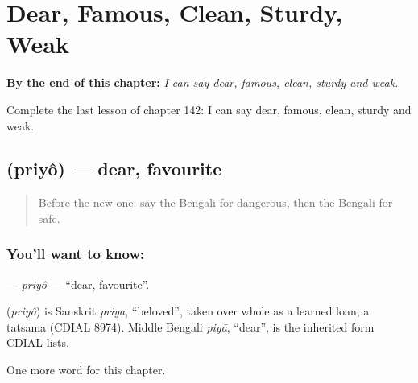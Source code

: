 
\chapter{Dear, Famous, Clean, Sturdy, Weak}
\label{ch:bn-dear-famous-clean-sturdy-weak}

\begin{chapteropening}
\textbf{By the end of this chapter:} \emph{I can say dear, famous, clean, sturdy and weak.}

Complete the last lesson of chapter 142: I can say dear, famous, clean, sturdy and weak.
\end{chapteropening}

\section[\texorpdfstring{\bn{প্রিয়} (priyô)}{প্রিয় (priyô)}]{ (priyô) — dear, favourite}

\label{lesson:BN-C142-priyo}



\begin{quote}
Before the new one: say the Bengali for dangerous, then the Bengali for safe.
\end{quote}

\subsection*{You'll want to know: }
\textbf{} — \emph{priyô} — \textquotedblleft{}dear, favourite\textquotedblright{}.

\begin{cousinweb}
\textbf{} (\emph{priyô}) is Sanskrit \emph{priya}, \textquotedblleft{}beloved\textquotedblright{}, taken over whole as a learned loan, a tatsama (CDIAL 8974). Middle Bengali \emph{piyā}, \textquotedblleft{}dear\textquotedblright{}, is the inherited form CDIAL lists.
\end{cousinweb}

\begin{grammarlens}[title={What you've built}]
One more word for this chapter.
\end{grammarlens}

